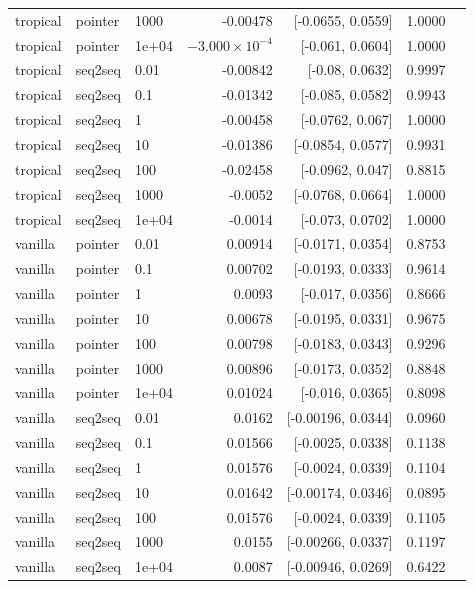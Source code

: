 \documentclass[10pt]{article}
\begin{document}
{\begin{longtable}{lllrrrl}
tropical & pointer & 1000 & -0.00478 & [-0.0655, 0.0559] & 1.0000 & \\
tropical & pointer & 1e+04 & $-3.000\times10^{-4}$ & [-0.061, 0.0604] & 1.0000 & \\
tropical & seq2seq & 0.01 & -0.00842 & [-0.08, 0.0632] & 0.9997 & \\
tropical & seq2seq & 0.1 & -0.01342 & [-0.085, 0.0582] & 0.9943 & \\
tropical & seq2seq & 1 & -0.00458 & [-0.0762, 0.067] & 1.0000 & \\
tropical & seq2seq & 10 & -0.01386 & [-0.0854, 0.0577] & 0.9931 & \\
tropical & seq2seq & 100 & -0.02458 & [-0.0962, 0.047] & 0.8815 & \\
tropical & seq2seq & 1000 & -0.0052 & [-0.0768, 0.0664] & 1.0000 & \\
tropical & seq2seq & 1e+04 & -0.0014 & [-0.073, 0.0702] & 1.0000 & \\
vanilla & pointer & 0.01 & 0.00914 & [-0.0171, 0.0354] & 0.8753 & \\
vanilla & pointer & 0.1 & 0.00702 & [-0.0193, 0.0333] & 0.9614 & \\
vanilla & pointer & 1 & 0.0093 & [-0.017, 0.0356] & 0.8666 & \\
vanilla & pointer & 10 & 0.00678 & [-0.0195, 0.0331] & 0.9675 & \\
vanilla & pointer & 100 & 0.00798 & [-0.0183, 0.0343] & 0.9296 & \\
vanilla & pointer & 1000 & 0.00896 & [-0.0173, 0.0352] & 0.8848 & \\
vanilla & pointer & 1e+04 & 0.01024 & [-0.016, 0.0365] & 0.8098 & \\
vanilla & seq2seq & 0.01 & 0.0162 & [-0.00196, 0.0344] & 0.0960 & \\
vanilla & seq2seq & 0.1 & 0.01566 & [-0.0025, 0.0338] & 0.1138 & \\
vanilla & seq2seq & 1 & 0.01576 & [-0.0024, 0.0339] & 0.1104 & \\
vanilla & seq2seq & 10 & 0.01642 & [-0.00174, 0.0346] & 0.0895 & \\
vanilla & seq2seq & 100 & 0.01576 & [-0.0024, 0.0339] & 0.1105 & \\
vanilla & seq2seq & 1000 & 0.0155 & [-0.00266, 0.0337] & 0.1197 & \\
vanilla & seq2seq & 1e+04 & 0.0087 & [-0.00946, 0.0269] & 0.6422 & \\
\bottomrule
\end{longtable}
}
\end{document}
